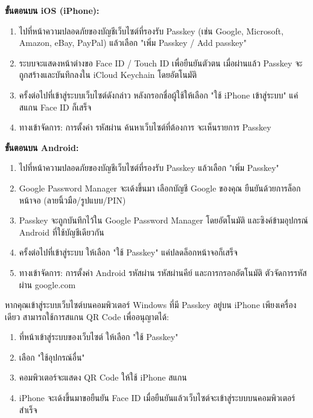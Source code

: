 
\textbf{ขั้นตอนบน iOS (iPhone):}

\begin{enumerate}
  \item ไปที่หน้าความปลอดภัยของบัญชีเว็บไซต์ที่รองรับ Passkey (เช่น Google, Microsoft, Amazon, eBay, PayPal) แล้วเลือก "เพิ่ม Passkey / Add passkey"
  \item ระบบจะแสดงหน้าต่างขอ Face ID / Touch ID เพื่อยืนยันตัวตน เมื่อผ่านแล้ว Passkey จะถูกสร้างและบันทึกลงใน iCloud Keychain โดยอัตโนมัติ
  \item ครั้งต่อไปที่เข้าสู่ระบบเว็บไซต์ดังกล่าว หลังกรอกชื่อผู้ใช้ให้เลือก "ใช้ iPhone เข้าสู่ระบบ" แค่สแกน Face ID ก็เสร็จ
  \item ทางเข้าจัดการ: การตั้งค่า รหัสผ่าน ค้นหาเว็บไซต์ที่ต้องการ จะเห็นรายการ Passkey
\end{enumerate}

\textbf{ขั้นตอนบน Android:}

\begin{enumerate}
  \item ไปที่หน้าความปลอดภัยของบัญชีเว็บไซต์ที่รองรับ Passkey แล้วเลือก "เพิ่ม Passkey"
  \item Google Password Manager จะเด้งขึ้นมา เลือกบัญชี Google ของคุณ ยืนยันด้วยการล็อกหน้าจอ (ลายนิ้วมือ/รูปแบบ/PIN)
  \item Passkey จะถูกบันทึกไว้ใน Google Password Manager โดยอัตโนมัติ และซิงค์ข้ามอุปกรณ์ Android ที่ใช้บัญชีเดียวกัน
  \item ครั้งต่อไปที่เข้าสู่ระบบ ให้เลือก "ใช้ Passkey" แค่ปลดล็อกหน้าจอก็เสร็จ
  \item ทางเข้าจัดการ: การตั้งค่า Android รหัสผ่าน รหัสผ่านคีย์ และการกรอกอัตโนมัติ ตัวจัดการรหัสผ่าน google.com
\end{enumerate}


หากคุณเข้าสู่ระบบเว็บไซต์บนคอมพิวเตอร์ Windows ที่มี Passkey อยู่บน iPhone เพียงเครื่องเดียว สามารถใช้การสแกน QR Code เพื่ออนุญาตได้:

\begin{enumerate}
  \item ที่หน้าเข้าสู่ระบบของเว็บไซต์ ให้เลือก "ใช้ Passkey"
  \item เลือก "ใช้อุปกรณ์อื่น"
  \item คอมพิวเตอร์จะแสดง QR Code ให้ใช้ iPhone สแกน
  \item iPhone จะเด้งขึ้นมาขอยืนยัน Face ID เมื่อยืนยันแล้วเว็บไซต์จะเข้าสู่ระบบบนคอมพิวเตอร์สำเร็จ
\end{enumerate}

